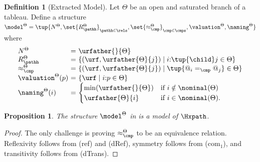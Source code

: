 \documentclass[10pt,a4paper]{amsart}
\newtheorem{prop}[thm]{Proposition}
\theoremstyle{definition}
\newtheorem{defi}[thm]{Definition}
\theoremstyle{remark}
\begin{document}
\begin{defi}[Extracted Model]\label{def:extmodel}
    Let $\Theta$ be an open and saturated branch of a tableau.
    Define a structure
        $ \model^\Theta =
            \tup{
                N^{\Theta},
                \set{R^{\Theta}_\pathh}_{\pathh \in \rels},
                \set{\approx^{\Theta}_{\cmp}}_{\cmp\in\cmps},
                \valuation^{\Theta},
                \naming^{\Theta}
            }$
    where
    \[
        \begin{array}{l@{\ }c@{\ }l}
            N^{\Theta}              & = & \urfather{}{\Theta} \\
            R^{\Theta}_\pathh       & = & \{(\urf,\urfather{\Theta}{j}) \mid  i{:}\tup{\child}j\in\Theta \} \\
            \approx^{\Theta}_{\cmp} & = & \{(\urf, \urfather{\Theta}{j}) \mid \tup{@_i =_\cmp @_{j}} \in\Theta \}\\            
            \valuation^{\Theta}(p) & = & \{\urf \mid  i{:}p \in \Theta \} \\
            \naming^{\Theta}(i) & = & 
                    \begin{cases}
                        \min(\urfather{}{\Theta}) & \text{if }  i \notin\nominal(\Theta)\\
                        \urfather{\Theta}{i} & \text{if } i\in\nominal(\Theta).
                    \end{cases} 	
        \end{array}
    \]
\end{defi}

\begin{prop}\label{prop:extmodel}
    The structure $\model^{\Theta}$ in  is a model of $\Hxpath$.
\end{prop}
\begin{proof}
    The only challenge is proving $\approx^{\Theta}_{\cmp}$ to be an equivalence relation. 
    Reflexivity follows from (ref) and (dRef), symmetry follows from (com$_1$), and transitivity follows from (dTrans).
\end{proof}
\end{document}

